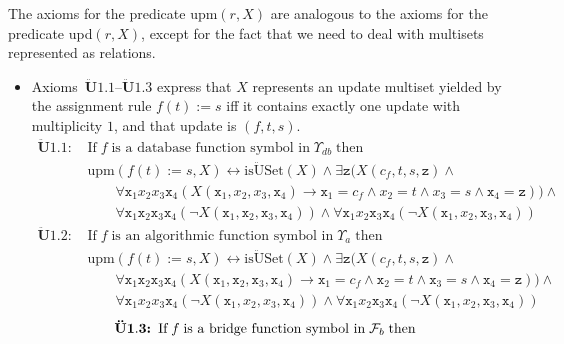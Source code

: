 \documentclass[preprint,11pt]{elsarticle}
\theoremstyle{definition}
\theoremstyle{remark}
\begin{document}
The axioms for the predicate upm$(r,X)$ are analogous to the axioms for the predicate upd$(r,X)$, except for the fact that we need to deal with multisets represented as relations.
\begin{itemize}
\item Axioms~$\mathbf{\ddot{U}1.1}$--$\mathbf{\ddot{U}1.3}$ express that $X$ represents an update multiset yielded by the assignment rule $f(t) := s$ iff it contains exactly one update with multiplicity $1$, and that update is $(f,t,s)$. 
\begin{align*}
\mathbf{\ddot{U}1.1}\textbf{: } & \text{If} \; f \; \text{is a database function symbol in} \; \Upsilon_{db} \; \text{then}&\\  
&\mathrm{upm}(f(t) := s, X) \leftrightarrow \mathrm{is\ddot{U}Set}(X) \wedge \exists \mathtt{z} \big(X(c_f, t, s, \mathtt{z}) \wedge &\\
&\qquad \forall \mathtt{x}_1 x_2 x_3 \mathtt{x}_4 (X(\mathtt{x}_1,x_2,x_3, \mathtt{x}_4) \rightarrow \mathtt{x}_1 = c_f \wedge x_2 = t \wedge x_3 = s \wedge \mathtt{x}_4 = \mathtt{z})\big) \wedge&\\
&\qquad \forall \mathtt{x}_1 \mathtt{x}_2 \mathtt{x}_3 \mathtt{x}_4 (\neg X(\mathtt{x}_1,\mathtt{x}_2,\mathtt{x}_3,\mathtt{x}_4)) \wedge \forall \mathtt{x}_1 x_2 \mathtt{x}_3 \mathtt{x}_4(\neg X(\mathtt{x}_1,x_2,\mathtt{x}_3,\mathtt{x}_4)) 
\end{align*}
\begin{align*}
\mathbf{\ddot{U}1.2}\textbf{: } & \text{If} \; f \; \text{is an algorithmic function symbol in} \; \Upsilon_{a} \; \text{then}&\\  
&\mathrm{upm}(f(t) := s, X) \leftrightarrow \mathrm{is\ddot{U}Set}(X) \wedge \exists \mathtt{z} \big(X(c_f, t, s, \mathtt{z}) \wedge &\\
&\qquad \forall \mathtt{x}_1 \mathtt{x}_2 \mathtt{x}_3 \mathtt{x}_4 (X(\mathtt{x}_1,\mathtt{x}_2,\mathtt{x}_3,\mathtt{x}_4) \rightarrow \mathtt{x}_1 = c_f \wedge \mathtt{x}_2 = t \wedge \mathtt{x}_3 = s \wedge \mathtt{x}_4 = \mathtt{z})\big) \wedge&\\
&\qquad \forall \mathtt{x}_1 x_2 x_3 \mathtt{x}_4 (\neg X(\mathtt{x}_1,x_2,x_3,\mathtt{x}_4)) \wedge \forall \mathtt{x}_1 x_2 \mathtt{x}_3 \mathtt{x}_4 (\neg X(\mathtt{x}_1,x_2,\mathtt{x}_3,\mathtt{x}_4)) 
\end{align*}
\begin{align*}
\mathbf{\ddot{U}1.3}\textbf{: }  & \text{If} \; f \; \text{is a bridge function symbol in} \; {\cal F}_b \; \text{then}&\\  

\end{align*}
\end{itemize}
\end{document}
